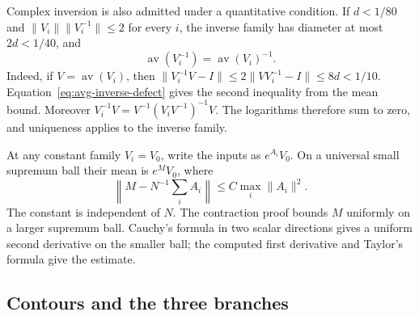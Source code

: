 \documentclass[11pt,letterpaper,reqno]{amsart}
\numberwithin{equation}{section}
\theoremstyle{definition}
\theoremstyle{remark}
\begin{document}
Complex inversion is also admitted under a quantitative condition.
If $d<1/80$ and $\|V_i\|\|V_i^{-1}\|\le2$ for every $i$, the
inverse family has diameter at most $2d<1/40$, and
\[
 \operatorname{av}(V_i^{-1})=\operatorname{av}(V_i)^{-1}.
\]
Indeed, if $V=\operatorname{av}(V_i)$, then
$\|V_i^{-1}V-I\|\le2\|VV_i^{-1}-I\|\le8d<1/10$.
Equation~\ref{eq:avg-inverse-defect} gives the second inequality
from the mean bound. Moreover
$V_i^{-1}V=V^{-1}(V_iV^{-1})^{-1}V$.
The logarithms therefore sum to zero, and uniqueness applies to
the inverse family.

At any constant family $V_i=V_0$, write the inputs as $e^{A_i}V_0$.
On a universal small supremum ball their mean is $e^M V_0$, where
\begin{equation}\label{eq:mean-quadratic}
 \left\|M-N^{-1}\sum_i A_i\right\|
                    \le C\max_i\|A_i\|^2.
\end{equation}
The constant is independent of $N$. The contraction proof bounds
$M$ uniformly on a larger supremum ball. Cauchy's formula in two
scalar directions gives a uniform second derivative on the smaller ball; the
computed first derivative and Taylor's formula give the estimate.

\subsection{Contours and the three branches}
\end{document}
